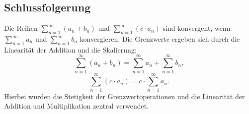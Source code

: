\documentclass[11pt]{article}
\begin{document}
\subsection*{Schlussfolgerung}
Die Reihen \(\sum_{n=1}^\infty (a_n + b_n)\) und \(\sum_{n=1}^\infty (c \cdot a_n)\) sind konvergent, wenn \(\sum_{n=1}^\infty a_n\) und \(\sum_{n=1}^\infty b_n\) konvergieren. Die Grenzwerte ergeben sich durch die Linearität der Addition und die Skalierung:
\[
\sum_{n=1}^\infty (a_n + b_n) = \sum_{n=1}^\infty a_n + \sum_{n=1}^\infty b_n,
\]
\[
\sum_{n=1}^\infty (c \cdot a_n) = c \cdot \sum_{n=1}^\infty a_n.
\]
Hierbei wurden die Stetigkeit der Grenzwertoperationen und die Linearität der Addition und Multiplikation zentral verwendet.
\end{document}
